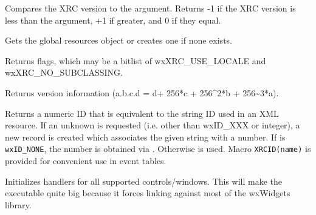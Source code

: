 \label{wxxmlresourcecompareversion}


Compares the XRC version to the argument. Returns -1 if the XRC version
is less than the argument, +1 if greater, and 0 if they equal.


\label{wxxmlresourceget}


Gets the global resources object or creates one if none exists.


\label{wxxmlresourcegetflags}


Returns flags, which may be a bitlist of wxXRC\_USE\_LOCALE and wxXRC\_NO\_SUBCLASSING.


\label{wxxmlresourcegetversion}


Returns version information (a.b.c.d = d+ 256*c + 256\textasciicircum2*b + 256\textasciitilde3*a).


\label{wxxmlresourcegetxmlid}


Returns a numeric ID that is equivalent to the string ID used in an XML
resource. If an unknown  is requested (i.e. other than wxID\_XXX
or integer), a new record is created which associates the given string with
a number. If  is \texttt{wxID\_NONE}, the number is obtained via
. Otherwise  is used.
Macro {\tt XRCID(name)} is provided for convenient use in event tables.

\label{wxxmlresourceinitallhandlers}


Initializes handlers for all supported controls/windows. This will
make the executable quite big because it forces linking against
most of the wxWidgets library.


\label{wxxmlresourceload}

